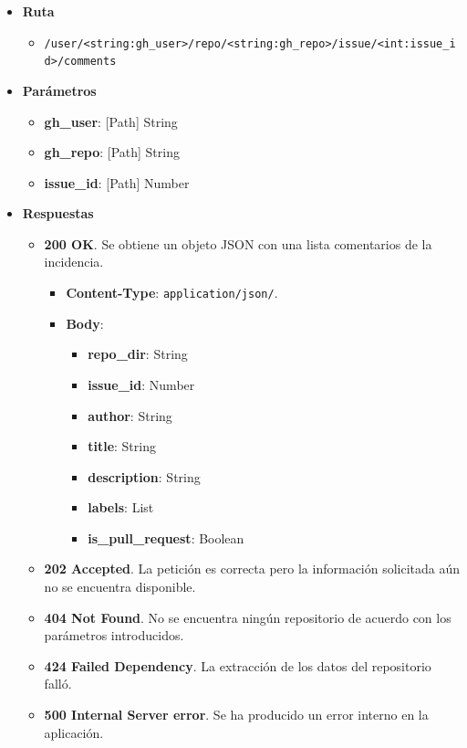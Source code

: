 \begin{itemize}
    \item[] \textbf{Ruta}
        \begin{itemize} \setlength\itemsep{0.2em}
            \item[] \texttt{/user/<string:gh\_user>/repo/<string:gh\_repo>/issue/<int:issue\_id>/comments}
        \end{itemize}
    \item[] \textbf{Parámetros}
        \begin{itemize} \setlength\itemsep{0.2em}
            \item[] \textbf{gh\_user}: [Path] String
            \item[] \textbf{gh\_repo}: [Path] String
            \item[] \textbf{issue\_id}: [Path] Number
        \end{itemize}
    \item[] \textbf{Respuestas}
        \begin{itemize} \setlength\itemsep{0.2em}
            \item[] \textbf{200 OK}. Se obtiene un objeto JSON con una lista comentarios de la incidencia.
                \begin{itemize} \setlength\itemsep{0.2em}
                    \item[] \textbf{Content-Type}: \texttt{application/json/}.
                    \item[] \textbf{Body}: 
                        \begin{itemize} \setlength\itemsep{0.2em}
                            \item[] \textbf{repo\_dir}: String
                            \item[] \textbf{issue\_id}: Number
                            \item[] \textbf{author}: String
                            \item[] \textbf{title}: String
                            \item[] \textbf{description}: String
                            \item[] \textbf{labels}: List
                            \item[] \textbf{is\_pull\_request}: Boolean
                        \end{itemize}
                \end{itemize}
            \item[] \textbf{202 Accepted}. La petición es correcta pero la información solicitada aún no se encuentra disponible.
            \item[] \textbf{404 Not Found}. No se encuentra ningún repositorio de acuerdo con los parámetros introducidos.
            \item[] \textbf{424 Failed Dependency}. La extracción de los datos del repositorio falló.
            \item[] \textbf{500 Internal Server error}. Se ha producido un error interno en la aplicación.
        \end{itemize}
\end{itemize}

